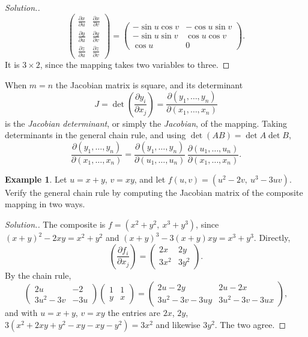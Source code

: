 \documentclass[11pt,a4paper]{article}
\theoremstyle{definition}
\newtheorem{exa}[thm]{Example}
\newenvironment{solution}
  {\renewcommand{\qedsymbol}{}\begin{proof}[\textit{Solution}.]}
  {\end{proof}}
\begin{document}
\begin{solution}
\[
\begin{pmatrix}
\frac{\partial x}{\partial u} & \frac{\partial x}{\partial v}\\[1ex]
\frac{\partial y}{\partial u} & \frac{\partial y}{\partial v}\\[1ex]
\frac{\partial z}{\partial u} & \frac{\partial z}{\partial v}
\end{pmatrix} =
\begin{pmatrix}
-\sin u \cos v & - \cos u\sin v\\
-\sin u \sin v & \cos u \cos v\\
\cos u & 0
\end{pmatrix} .
\]
It is $3\times 2$, since the mapping takes two variables to three.
\end{solution}

When $m = n$ the Jacobian matrix is square, and its determinant
\[ J = \det \left(\frac{\partial y_i}{\partial x_j}\right) =
\frac{\partial(y_1,\dots ,y_n)}{\partial (x_1,\dots ,x_n)}\]
is the \emph{Jacobian determinant}, or simply the \emph{Jacobian}, of the
mapping. Taking determinants in the general chain rule, and using
$\det(AB) = \det A\det B$,
\[\frac{\partial(y_1,\dots,y_n)}{\partial(x_1,\dots,x_n)} =
\frac{\partial(y_1,\dots,y_n)}{\partial(u_1,\dots,u_n)}\,
\frac{\partial(u_1,\dots,u_n)}{\partial(x_1,\dots,x_n)} .\]

\begin{exa}
\label{ex:chainmatrix}
Let $u = x + y$, $v = xy$, and let $f(u,v) = (u^2 - 2v,\ u^3 - 3uv)$. Verify the
general chain rule by computing the Jacobian matrix of the composite mapping in
two ways.
\end{exa}

\begin{solution}
The composite is $f = (x^2 + y^2,\ x^3 + y^3)$, since
$(x+y)^2 - 2xy = x^2 + y^2$ and $(x+y)^3 - 3(x+y)xy = x^3 + y^3$. Directly,
\[\left(\frac{\partial f_i}{\partial x_j}\right) = \begin{pmatrix} 2x & 2y\\ 3x^2
& 3y^2\end{pmatrix}.\]
By the chain rule,
\[\begin{pmatrix} 2u & -2\\ 3u^2 - 3v & -3u\end{pmatrix}\begin{pmatrix}1 & 1\\ y
& x\end{pmatrix} = \begin{pmatrix} 2u - 2y & 2u - 2x\\ 3u^2 - 3v - 3uy & 3u^2 -
3v - 3ux\end{pmatrix},\]
and with $u = x + y$, $v = xy$ the entries are $2x$, $2y$,
$3(x^2 + 2xy + y^2 - xy - xy - y^2) = 3x^2$ and likewise $3y^2$. The two agree.
\end{solution}
\end{document}
